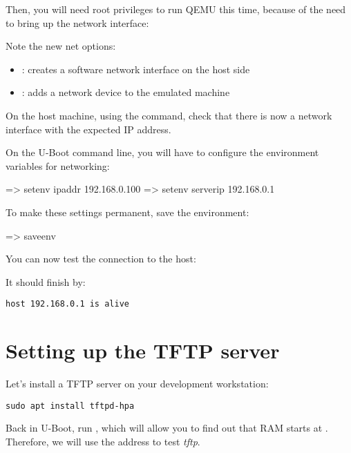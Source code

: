 Then, you will need root privileges to run QEMU this time,
because of the need to bring up the network interface:


Note the new net options:
\begin{itemize}
\item {}: creates a software network interface on the host side
\item \code{-net nic}: adds a network device to the emulated machine
\end{itemize}

On the host machine, using the \code{ip a} command, check that
there is now a  network interface with the expected IP
address.

On the U-Boot command line, you will have to configure the environment
variables for networking:

\begin{ubootinput}
=> setenv ipaddr 192.168.0.100
=> setenv serverip 192.168.0.1
\end{ubootinput}

To make these settings permanent, save the environment:

\begin{ubootinput}
=> saveenv
\end{ubootinput}

You can now test the connection to the host:

It should finish by:
\begin{verbatim}
host 192.168.0.1 is alive
\end{verbatim}

\section{Setting up the TFTP server}

Let's install a TFTP server on your development workstation:

\begin{verbatim}
sudo apt install tftpd-hpa
\end{verbatim}


Back in U-Boot, run , which will allow you to find out that
RAM starts at . Therefore, we will use the 
address to test {\em tftp}.

